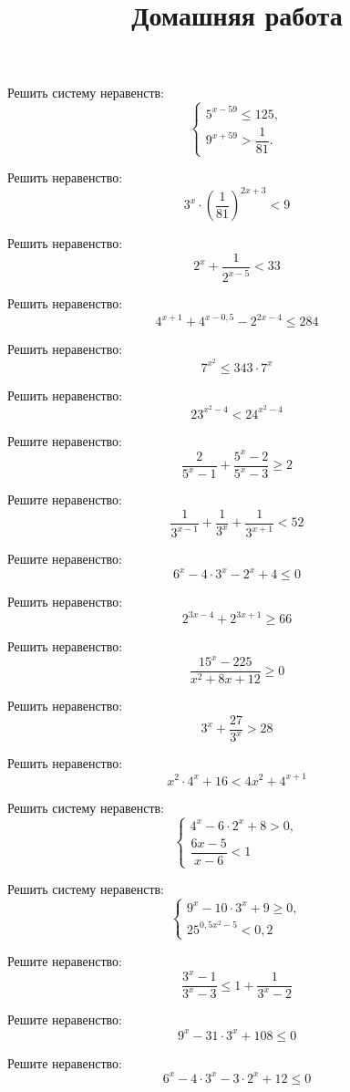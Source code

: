 \begin{consultation}
	\begin{listofex}
		\item Решить систему неравенств:
		\[ \left\{
		\begin{array}{l}
			5^{x-59}\le125,\\
			9^{x+59}>\dfrac{1}{81}.
		\end{array}
		\right. \]
		\item Решить неравенство:
		\[ 3^x\cdot\left( \dfrac{1}{81} \right)^{2x+3}<9 \]
		\item Решить неравенство:
		\[ 2^x+\dfrac{1}{2^{x-5}}<33 \]
		\item Решить неравенство:
		\[ 4^{x+1}+4^{x-0,5}-2^{2x-4}\le284 \]
		\item Решить неравенство:
		\[ 7^{x^2}\le343\cdot7^x \]
		\item Решить неравенство:
		\[ 23^{x^2-4}<24^{x^2-4} \]
		\item Решите неравенство:
		\[ \dfrac{2}{5^x-1}+\dfrac{5^x-2}{5^x-3}\ge2 \]
		\item Решите неравенство:
		\[ \dfrac{1}{3^{x-1}}+\dfrac{1}{3^x}+\dfrac{1}{3^{x+1}}<52 \]
		\item Решите неравенство:
		\[ 6^x-4\cdot3^x-2^x+4\le0 \]
	\end{listofex}
	\newpage
	\title{Домашняя работа}
	\begin{listofex}
		\item Решить неравенство: \[ 2^{3x-4} +2^{3x+1} \ge 66 \]
		\item Решить неравенство: \[ \dfrac{15^x-225}{x^2+8x+12} \ge 0 \]
		\item Решить неравенство: \[ 3^x + \dfrac{27}{3^x} > 28 \]
		\item Решить неравенство: \[ x^2 \cdot 4^x + 16 < 4x^2 + 4^{x+1} \]
		\item Решить систему неравенств: 
		\[ \left\{
		\begin{array}{l}
			4^x-6 \cdot 2^x +8 >0, \\
			\dfrac{6x-5}{x-6} < 1
		\end{array}
		\right. \]
		\item Решить систему неравенств: 
		\[ \left\{
		\begin{array}{l}
			9^x - 10 \cdot 3^x + 9 \ge 0, \\
			25^{0,5x^2-5} < 0,2
		\end{array}
		\right. \]
		\item Решите неравенство:
		\[ \dfrac{3^x-1}{3^x-3}\le1+\dfrac{1}{3^x-2} \]
		\item Решите неравенство:
		\[ 9^x-31\cdot3^x+108\le0 \]
		\item Решите неравенство:
		\[ 6^x-4\cdot3^x-3\cdot2^x+12\le0 \]
	\end{listofex}
\end{consultation}

